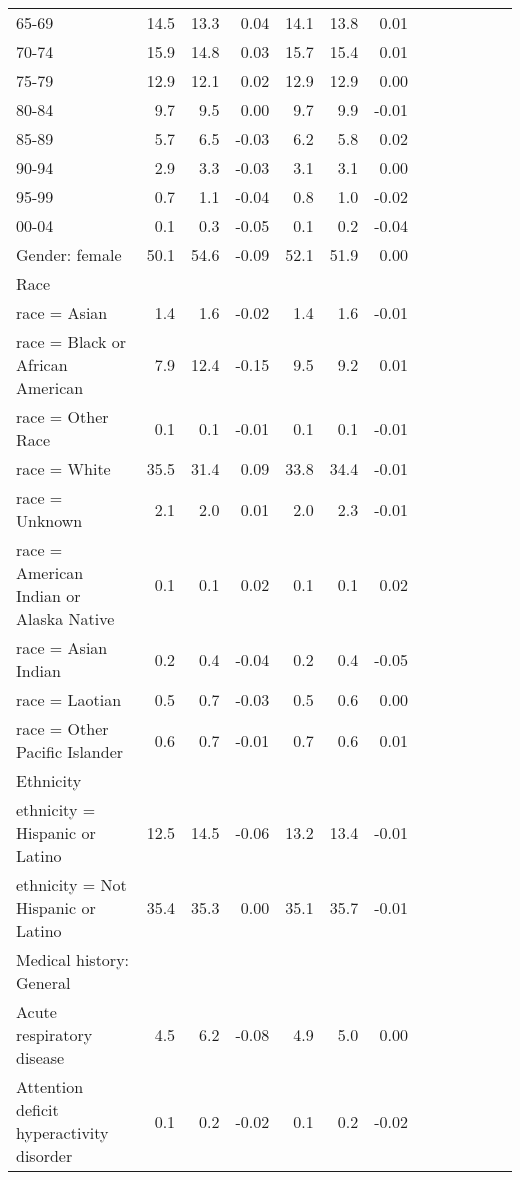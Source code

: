 \documentclass[11pt,]{article}
\begin{document}
\begin{longtable}{lrrrrrrrrrrrr}
      65-69 & 14.5 & 13.3 &  0.04 & 14.1 & 13.8 &  0.01 \\ 
      70-74 & 15.9 & 14.8 &  0.03 & 15.7 & 15.4 &  0.01 \\ 
      75-79 & 12.9 & 12.1 &  0.02 & 12.9 & 12.9 &  0.00 \\ 
      80-84 &  9.7 &  9.5 &  0.00 &  9.7 &  9.9 & -0.01 \\ 
      85-89 &  5.7 &  6.5 & -0.03 &  6.2 &  5.8 &  0.02 \\ 
      90-94 &  2.9 &  3.3 & -0.03 &  3.1 &  3.1 &  0.00 \\ 
      95-99 &  0.7 &  1.1 & -0.04 &  0.8 &  1.0 & -0.02 \\ 
      00-04 &  0.1 &  0.3 & -0.05 &  0.1 &  0.2 & -0.04 \\ 
  Gender: female & 50.1 & 54.6 & -0.09 & 52.1 & 51.9 &  0.00 \\ 
  Race &    &    &     &    &    &     \\ 
      race = Asian &  1.4 &  1.6 & -0.02 &  1.4 &  1.6 & -0.01 \\ 
      race = Black or African American &  7.9 & 12.4 & -0.15 &  9.5 &  9.2 &  0.01 \\ 
      race = Other Race &  0.1 &  0.1 & -0.01 &  0.1 &  0.1 & -0.01 \\ 
      race = White & 35.5 & 31.4 &  0.09 & 33.8 & 34.4 & -0.01 \\ 
      race = Unknown &  2.1 &  2.0 &  0.01 &  2.0 &  2.3 & -0.01 \\ 
      race = American Indian or Alaska Native &  0.1 &  0.1 &  0.02 &  0.1 &  0.1 &  0.02 \\ 
      race = Asian Indian &  0.2 &  0.4 & -0.04 &  0.2 &  0.4 & -0.05 \\ 
      race = Laotian &  0.5 &  0.7 & -0.03 &  0.5 &  0.6 &  0.00 \\ 
      race = Other Pacific Islander &  0.6 &  0.7 & -0.01 &  0.7 &  0.6 &  0.01 \\ 
  Ethnicity &    &    &     &    &    &     \\ 
      ethnicity = Hispanic or Latino & 12.5 & 14.5 & -0.06 & 13.2 & 13.4 & -0.01 \\ 
      ethnicity = Not Hispanic or Latino & 35.4 & 35.3 &  0.00 & 35.1 & 35.7 & -0.01 \\ 
  Medical history: General &    &    &     &    &    &     \\ 
      Acute respiratory disease &  4.5 &  6.2 & -0.08 &  4.9 &  5.0 &  0.00 \\ 
      Attention deficit hyperactivity disorder &  0.1 &  0.2 & -0.02 &  0.1 &  0.2 & -0.02 \\ 

\end{longtable}
\end{document}
